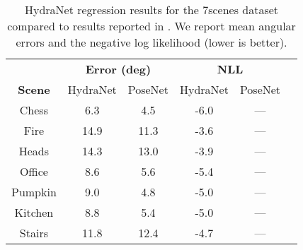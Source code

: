 \begin{table}[]
	\caption{HydraNet regression results for the 7scenes dataset compared to results reported in \citep{Kendall2017-ud}. We report mean angular errors and the negative log likelihood (lower is better).}
	\centering
	\begin{threeparttable}
	\begin{tabular}{cccccc}
		\toprule
		& \multicolumn{2}{c}{\textbf{Error (deg)}} & \multicolumn{2}{c}{\textbf{NLL}} \\ \cmidrule{2-5} 
		\textbf{Scene} & HydraNet & PoseNet & HydraNet & PoseNet \\ \midrule
		Chess & 6.3 & 4.5 & -6.0 & --- \\
		Fire & 14.9 & 11.3 & -3.6 & --- \\
		Heads & 14.3 & 13.0 & -3.9 & --- \\
		Office & 8.6 & 5.6 & -5.4 & --- \\
		Pumpkin & 9.0 & 4.8 & -5.0 & --- \\
		Kitchen & 8.8 & 5.4 & -5.0 & --- \\
		Stairs & 11.8 & 12.4 & -4.7 & --- \\ \bottomrule
	\end{tabular}
\end{threeparttable}
\label{tab:7scenes_stats}
\end{table}


